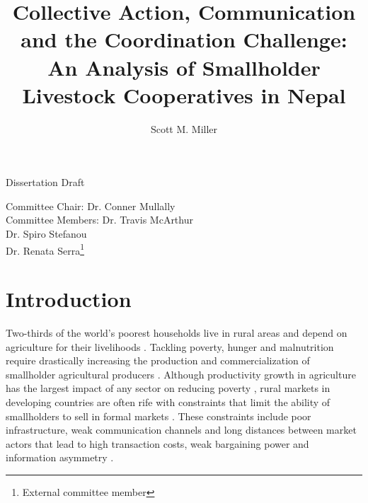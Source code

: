 \documentclass[11pt]{article}
\begin{document}



\title{Collective Action, Communication and the Coordination Challenge: An Analysis of Smallholder Livestock Cooperatives in Nepal \vspace{1cm}}

\author{Scott M. Miller}
\date{}

\sloppy
\maketitle

\begin{center}
    \large{Dissertation Draft}
\end{center}

\vspace{2cm}

Committee Chair: Dr. Conner Mullally \\

Committee Members: Dr. Travis McArthur \\

\hspace{1.45in} Dr. Spiro Stefanou \\

\hspace{1.45in} Dr. Renata Serra\footnote{External committee member} \\




%

\clearpage
\renewcommand{\cftsecleader}{\cftdotfill{\cftdotsep}}

\tableofcontents
\clearpage

\doublespacing
\thispagestyle{plain}
\setcounter{page}{1}

\section{Introduction} \label{sec:intro}
Two-thirds of the world's poorest households live in rural areas and depend on agriculture for their livelihoods \citep{fugile-et.al.19}. Tackling poverty, hunger and malnutrition require drastically increasing the production and commercialization of smallholder agricultural producers \citep{fisher-qaim12,worldbank08}. Although productivity growth in agriculture has the largest impact of any sector on reducing poverty \citep{fugile-et.al.19}, rural markets in developing countries are often rife with constraints that limit the ability of smallholders to sell in formal markets \citep{ashby-et.al.09,kristjanson-et.al.14}. These constraints include poor infrastructure, weak communication channels and long distances between market actors that lead to high transaction costs, weak bargaining power and information asymmetry \citep{aker10,barrett.08,key.et.al.00,staal-et.al.97}. 
\end{document}
